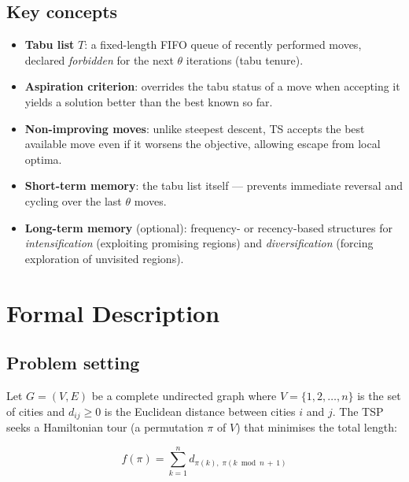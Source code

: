 \documentclass[12pt,a4paper]{article}
\begin{document}
\subsection*{Key concepts}

\begin{itemize}[leftmargin=1.5em]
  \item \textbf{Tabu list} $T$: a fixed-length FIFO queue of recently performed
    moves, declared \emph{forbidden} for the next $\theta$ iterations (tabu
    tenure).
  \item \textbf{Aspiration criterion}: overrides the tabu status of a move when
    accepting it yields a solution better than the best known so far.
  \item \textbf{Non-improving moves}: unlike steepest descent, TS accepts the
    best available move even if it worsens the objective, allowing escape from
    local optima.
  \item \textbf{Short-term memory}: the tabu list itself --- prevents immediate
    reversal and cycling over the last $\theta$ moves.
  \item \textbf{Long-term memory} (optional): frequency- or recency-based
    structures for \emph{intensification} (exploiting promising regions) and
    \emph{diversification} (forcing exploration of unvisited regions).
\end{itemize}

\section{Formal Description}

\subsection{Problem setting}

Let $G = (V, E)$ be a complete undirected graph where
$V = \{1, 2, \ldots, n\}$ is the set of cities and $d_{ij} \geq 0$ is the
Euclidean distance between cities $i$ and $j$.
The TSP seeks a Hamiltonian tour (a permutation $\pi$ of $V$) that minimises
the total length:

\begin{equation}
f(\pi) = \sum_{k=1}^{n} d_{\pi(k),\; \pi(k \bmod n\, +\, 1)}
\label{eq:tsp_obj}
\end{equation}
\end{document}
